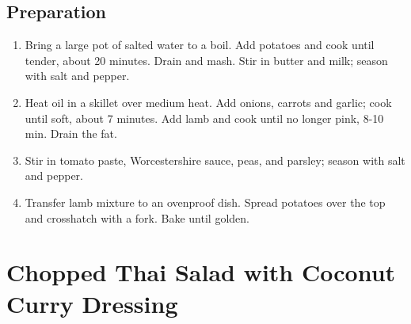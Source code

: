 \documentclass[letterpaper,10pt,english]{sphinxmanual}
\begin{document}
\section{Preparation}
\label{\detokenize{Shep_Pie:preparation}}\begin{enumerate}
\item {} 
Bring a large pot of salted water to a boil. Add potatoes and cook until tender, about 20 minutes. Drain and mash. Stir in butter and milk; season with salt and pepper.

\item {} 
Heat oil in a skillet over medium heat. Add onions, carrots and garlic; cook until soft, about 7 minutes. Add lamb and cook until no longer pink, 8-10 min. Drain the fat.

\item {} 
Stir in tomato paste, Worcestershire sauce, peas, and parsley; season with salt and pepper.

\item {} 
Transfer lamb mixture to an ovenproof dish. Spread potatoes over the top and crosshatch with a fork. Bake until golden.

\end{enumerate}


\chapter{Chopped Thai Salad with Coconut Curry Dressing}
\label{\detokenize{Chop_Thai_Salad_w_Peanut_Sauce:chopped-thai-salad-with-coconut-curry-dressing}}\label{\detokenize{Chop_Thai_Salad_w_Peanut_Sauce::doc}}
\end{document}
